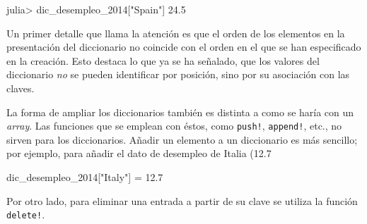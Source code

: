 ﻿\documentclass{article}
\newcommand{\jl}{\texttt}
\begin{document}
julia> dic_desempleo_2014["Spain"]
24.5

Un primer detalle que llama la atención es que el orden de los elementos en la presentación del diccionario no coincide con el orden en el que se han especificado en la creación. Esto destaca lo que ya se ha señalado, que los valores del diccionario \emph{no} se pueden identificar por posición, sino por su asociación con las claves.

La forma de ampliar los diccionarios también es distinta a como se haría con un \emph{array}. Las funciones que se emplean con éstos, como \jl{push!}, \jl{append!}, etc., no sirven para los diccionarios. Añadir un elemento a un diccionario es más sencillo; por ejemplo, para añadir el dato de desempleo de Italia (12.7%

dic_desempleo_2014["Italy"] = 12.7

Por otro lado, para eliminar una entrada a partir de su clave se utiliza la función \jl{delete!}. 
\end{document}
